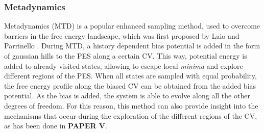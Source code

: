 \subsubsection*{Metadynamics}
Metadynamics (MTD) is a popular enhanced sampling method, used to overcome barriers in the free energy landscape, which was first proposed by Laio and Parrinello \cite{laio2002escaping, barducci2011metadynamics}. During MTD, a history dependent bias potential is added in the form of gaussian hills to the PES along a certain CV. This way, potential energy is added to already visited states, allowing to escape local \textit{minima} and explore different regions of the PES. When all states are sampled with equal probability, the free energy profile along the biased CV can be obtained from the added bias potential. As the bias is added, the system is able to evolve along all the other degrees of freedom. For this reason, this method can also provide insight into the mechanisms that occur during the exploration of the different regions of the CV, as has been done in \textbf{PAPER V}. 

